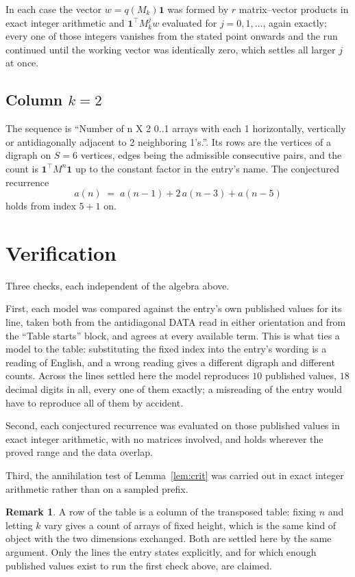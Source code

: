 \documentclass[11pt,a4paper]{article}
\theoremstyle{plain}
\theoremstyle{definition}
\newtheorem{remark}[theorem]{Remark}
\begin{document}
In each case the vector $w=q(M_k)\mathbf{1}$ was formed by $r$ matrix--vector products in
exact integer arithmetic and $\mathbf{1}^{\!\top}M_k^{j}w$ evaluated for $j=0,1,\dots$,
again exactly; every one of those integers vanishes from the stated point onwards and the run
continued until the working vector was identically zero, which settles all larger $j$ at once.

\subsection*{Column $k$$=2$}
The sequence is ``Number of n X 2 0..1 arrays with each 1 horizontally, vertically or antidiagonally adjacent to 2 neighboring 1's.''. Its rows are the vertices of a digraph on
$S=6$ vertices, edges being the admissible consecutive pairs, and the count is
$\mathbf{1}^{\!\top}M^{n}\mathbf{1}$ up to the constant factor in the entry's name.
The conjectured recurrence
\[
a(n)\;=\;a(n-1) + 2\,a(n-3) + a(n-5)
\]
holds from index $5+1$ on.

\section{Verification}

Three checks, each independent of the algebra above.

First, each model was compared against the entry's own published values for its line, taken
both from the antidiagonal DATA read in either orientation and from the ``Table starts''
block, and agrees at every available term. This is what ties a model to the table:
substituting the fixed index into the entry's wording is a reading of English, and a wrong
reading gives a different digraph and different counts. Across the lines settled here the
model reproduces $10$ published values, $18$ decimal digits in all, every one of
them exactly; a misreading of the entry would have to reproduce all of them by accident.

Second, each conjectured recurrence was evaluated on those published values in exact
integer arithmetic, with no matrices involved, and holds wherever the proved range and the
data overlap.

Third, the annihilation test of Lemma~\ref{lem:crit} was carried out in exact integer
arithmetic rather than on a sampled prefix.

\begin{remark}
A row of the table is a column of the transposed table: fixing $n$ and letting $k$ vary gives a
count of arrays of fixed height, which is the same kind of object with the two dimensions
exchanged. Both are settled here by the same argument. Only the lines the entry states
explicitly, and for which enough published values exist to run the first check above, are
claimed.
\end{remark}
\end{document}
